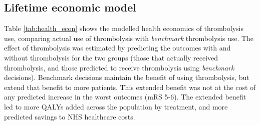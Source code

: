 \subsection{Lifetime economic model}

Table \ref{tab:health_econ} shows the modelled health economics of thrombolysis use, comparing actual use of thrombolysis with \textit{benchmark} thrombolysis use. The effect of thrombolysis was estimated by predicting the outcomes with and without thrombolysis for the two groups (those that actually received thrombolysis, and those predicted to receive thrombolysis using \textit{benchmark} decisions). Benchmark decisions maintain the benefit of using thrombolysis, but extend that benefit to more patients. This extended benefit was not at the cost of any predicted increase in the worst outcomes (mRS 5-6). The extended benefit led to more QALYs added across the population by treatment, and more predicted savings to NHS healthcare costs.

